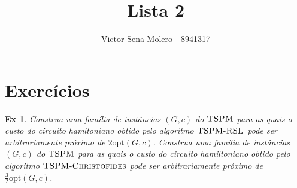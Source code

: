 \documentclass[12pt]{article}
\newcounter{exCounter}
\newtheorem{ex}[exCounter]{Ex}
\begin{document}
 
 
\title{Lista 2}
\author{Victor Sena Molero - 8941317}
\maketitle

\section{Exercícios}
\begin{ex}
Construa uma família de instâncias $(G,c)$ do $\textsc{TSPM}$ para as quais o custo do circuito hamltoniano obtido pelo algoritmo $\textsc{TSPM-RSL}$ pode ser arbitrariamente próximo de $2\textrm{opt}(G,c)$. Construa uma família de instâncias $(G,c)$ do $\textsc{TSPM}$ para as quais o custo do circuito hamiltoniano obtido pelo algoritmo $\textsc{TSPM-Christofides}$ pode ser arbitrariamente próximo de $\frac{3}{2}\textrm{opt}(G,c)$.  
\end{ex}
\end{document}
